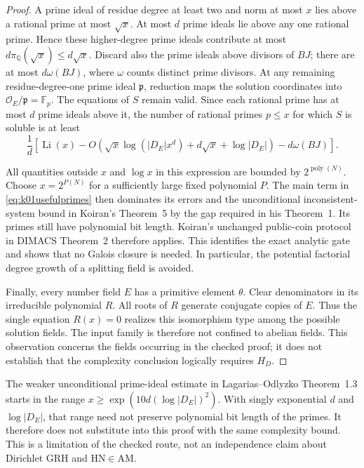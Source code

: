 \begin{proof}
A prime ideal of residue degree at least two and norm at most $x$
lies above a rational prime at most $\sqrt{x}$. At most $d$ prime
ideals lie above any one rational prime. Hence these higher-degree
prime ideals contribute at most $d\pi_{\mathbb Q}(\sqrt{x})\le
d\sqrt{x}$. Discard also the prime ideals above divisors of $BJ$;
there are at most $d\omega(BJ)$, where $\omega$ counts distinct prime
divisors. At any remaining residue-degree-one prime ideal
$\mathfrak p$, reduction maps the solution coordinates into
$\mathcal O_E/\mathfrak p=\mathbb F_p$. The equations of $S$ remain
valid. Since each rational prime has at most $d$ prime ideals above it,
the number of rational primes $p\le x$ for which $S$ is soluble is at
least
\begin{equation}
 \frac{1}{d}\left[
 \operatorname{Li}(x)
 -O\!\left(\sqrt{x}\log(|D_E|x^d)+d\sqrt{x}+\log|D_E|\right)
 -d\omega(BJ)\right].
 \label{eq:k01usefulprimes}
\end{equation}

All quantities outside $x$ and $\log x$ in this expression are bounded
by $2^{\operatorname{poly}(N)}$. Choose
$x=2^{P(N)}$ for a sufficiently large fixed polynomial $P$.
The main term in \eqref{eq:k01usefulprimes} then dominates its errors
and the unconditional inconsistent-system bound in Koiran's
Theorem~5 by the gap required in his Theorem~1. Its primes still have
polynomial bit length. Koiran's unchanged public-coin protocol in
DIMACS Theorem~2 therefore applies. This identifies the exact analytic
gate and shows that no Galois closure is needed. In particular, the
potential factorial degree growth of a splitting field is avoided.

Finally, every number field $E$ has a primitive element $\theta$.
Clear denominators in its irreducible polynomial $R$. All roots of
$R$ generate conjugate copies of $E$. Thus the single equation
$R(x)=0$ realizes this isomorphism type among the possible solution
fields. The input family is therefore not confined to abelian fields.
This observation concerns the fields occurring in the checked proof;
it does not establish that the complexity conclusion logically
requires $H_D$.
\end{proof}

The weaker unconditional prime-ideal estimate in
Lagarias--Odlyzko Theorem~1.3 starts in the range
$x\ge\exp(10d(\log|D_E|)^2)$. With singly exponential $d$ and
$\log|D_E|$, that range need not preserve polynomial bit length of
the primes. It therefore does not substitute into this proof with the
same complexity bound. This is a limitation of the checked route,
not an independence claim about Dirichlet GRH and $\mathrm{HN}\in
\mathrm{AM}$.

